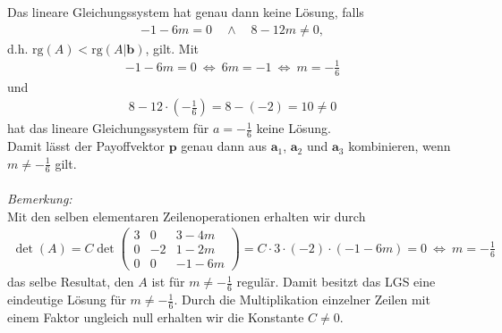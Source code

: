 Das lineare Gleichungssystem hat genau dann keine Lösung, falls
\begin{align*}
-1 - 6m = 0 \quad \wedge \quad 8 - 12 m \neq 0,
\end{align*}
d.h. $ \mathrm{rg}(A) < \mathrm{rg}(A | \textbf{b}) $, gilt.
Mit 
\begin{align*}
-1 - 6m = 0 
\ \Leftrightarrow \
6m = -1
\ \Leftrightarrow \
m = -\frac{1}{6}
\end{align*}
und
\begin{align*}
8 - 12 \cdot \left( -\frac{1}{6} \right)= 8 - (-2) = 10 \neq 0
\end{align*}
hat das lineare Gleichungssystem für $ a = -\frac{1}{6} $ keine Lösung.\\
Damit lässt der Payoffvektor $ \textbf{p} $ genau dann aus $ \textbf{a}_1 $, $\textbf{a}_2  $ und $ \textbf{a}_3 $ kombinieren, wenn $ m \neq - \frac{1}{6} $ gilt.\\
\\
\textit{Bemerkung:}\\
Mit den selben elementaren Zeilenoperationen erhalten wir durch
\begin{align*}
\det(A)
= 
C
\det 
\begin{pmatrix}
3 & 0  & 3 - 4m\\
0 & -2  & 1-2m\\
0 & 0  & -1-6m 
\end{pmatrix}
= 
C \cdot 3 \cdot (-2) \cdot (-1-6m) 
= 0 
\ \Leftrightarrow \ 
m = - \frac{1}{6}
\end{align*} 
das selbe Resultat, den $ A  $ ist für $ m \neq -\frac{1}{6} $ regulär.
Damit besitzt das LGS eine eindeutige Lösung für $ m \neq - \frac{1}{6} $.
Durch die Multiplikation einzelner Zeilen mit einem Faktor ungleich null erhalten wir die Konstante $ C \neq 0 $.
\newpage
